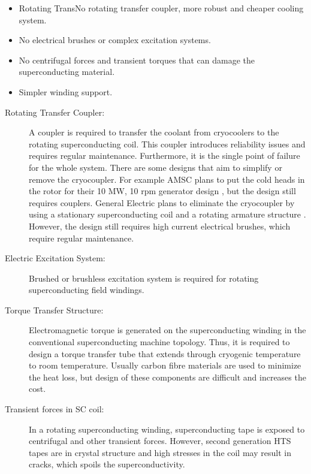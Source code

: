 \documentclass[12pt]{IET02}
\begin{document}
\begin{itemize}
  \item Rotating TransNo rotating transfer coupler, more robust and cheaper cooling system.
  \item No electrical brushes or complex excitation systems.
  \item No centrifugal forces and transient torques that can damage the superconducting material.
  \item Simpler winding support.
\end{itemize}

\begin{description}
  \item[Rotating Transfer Coupler:] A coupler is required to transfer the coolant from cryocoolers to the rotating superconducting coil. This coupler introduces reliability issues and requires regular maintenance. Furthermore, it is the single point of failure for the whole system. There are some designs that aim to simplify or remove the cryocoupler. For example AMSC plans to put the cold heads in the rotor for their 10 MW, 10 rpm generator design \cite{amsc_presentation}, but the design still requires couplers. General Electric plans to eliminate the cryocoupler by using a stationary superconducting coil and a rotating armature structure \cite{Stautner2012}. However, the design still requires high current electrical brushes, which require regular maintenance.

  \item[Electric Excitation System:] Brushed or brushless excitation system is required for rotating superconducting field windings.

  \item[Torque Transfer Structure:] Electromagnetic torque is generated on the superconducting winding in the conventional superconducting machine topology. Thus, it is required to design a torque transfer tube that extends through cryogenic temperature to room temperature. Usually carbon fibre materials are used to minimize the heat loss, but design of these components are difficult and increases the cost.

  \item[Transient forces in SC coil:] In a rotating superconducting winding, superconducting tape is exposed to centrifugal and other transient forces. However, second generation HTS tapes are in crystal structure and high stresses in the coil may result in cracks, which spoils the superconductivity.
\end{description}
\end{document}
